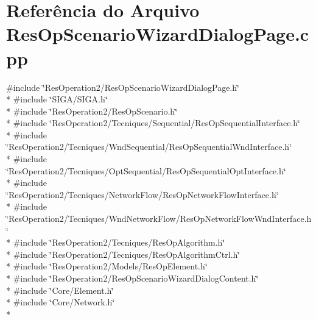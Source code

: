 \section{Referência do Arquivo Res\+Op\+Scenario\+Wizard\+Dialog\+Page.\+cpp}
\label{_res_op_scenario_wizard_dialog_page_8cpp}
{\ttfamily \#include \char`\"{}Res\+Operation2/\+Res\+Op\+Scenario\+Wizard\+Dialog\+Page.\+h\char`\"{}}\\*
{\ttfamily \#include \char`\"{}S\+I\+G\+A/\+S\+I\+G\+A.\+h\char`\"{}}\\*
{\ttfamily \#include \char`\"{}Res\+Operation2/\+Res\+Op\+Scenario.\+h\char`\"{}}\\*
{\ttfamily \#include \char`\"{}Res\+Operation2/\+Tecniques/\+Sequential/\+Res\+Op\+Sequential\+Interface.\+h\char`\"{}}\\*
{\ttfamily \#include \char`\"{}Res\+Operation2/\+Tecniques/\+Wnd\+Sequential/\+Res\+Op\+Sequential\+Wnd\+Interface.\+h\char`\"{}}\\*
{\ttfamily \#include \char`\"{}Res\+Operation2/\+Tecniques/\+Opt\+Sequential/\+Res\+Op\+Sequential\+Opt\+Interface.\+h\char`\"{}}\\*
{\ttfamily \#include \char`\"{}Res\+Operation2/\+Tecniques/\+Network\+Flow/\+Res\+Op\+Network\+Flow\+Interface.\+h\char`\"{}}\\*
{\ttfamily \#include \char`\"{}Res\+Operation2/\+Tecniques/\+Wnd\+Network\+Flow/\+Res\+Op\+Network\+Flow\+Wnd\+Interface.\+h\char`\"{}}\\*
{\ttfamily \#include \char`\"{}Res\+Operation2/\+Tecniques/\+Res\+Op\+Algorithm.\+h\char`\"{}}\\*
{\ttfamily \#include \char`\"{}Res\+Operation2/\+Tecniques/\+Res\+Op\+Algorithm\+Ctrl.\+h\char`\"{}}\\*
{\ttfamily \#include \char`\"{}Res\+Operation2/\+Models/\+Res\+Op\+Element.\+h\char`\"{}}\\*
{\ttfamily \#include \char`\"{}Res\+Operation2/\+Res\+Op\+Scenario\+Wizard\+Dialog\+Content.\+h\char`\"{}}\\*
{\ttfamily \#include \char`\"{}Core/\+Element.\+h\char`\"{}}\\*
{\ttfamily \#include \char`\"{}Core/\+Network.\+h\char`\"{}}\\*

